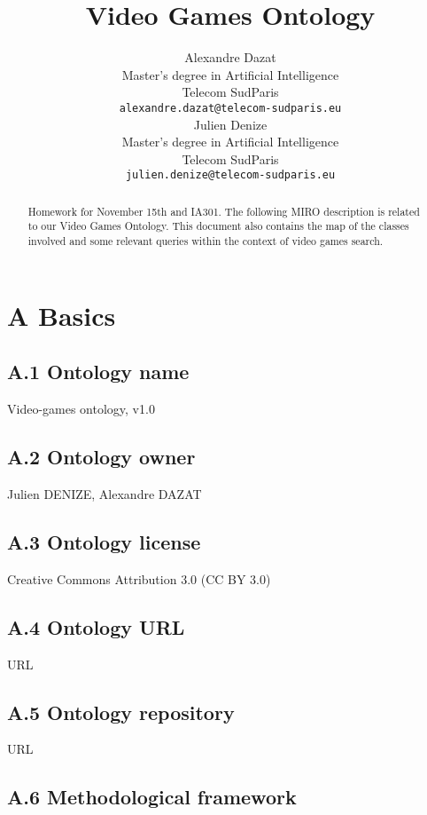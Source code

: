 \documentclass{article}
\title{Video Games Ontology}
\author{
  Alexandre Dazat \\
  Master's degree in Artificial Intelligence\\
  Telecom SudParis\\
  \texttt{alexandre.dazat@telecom-sudparis.eu} \\
   \And
  Julien Denize\\
  Master's degree in Artificial Intelligence\\
  Telecom SudParis\\
  \texttt{julien.denize@telecom-sudparis.eu} \\
}
\begin{document}
\maketitle

\begin{abstract}
Homework for November 15th and IA301. 
The following MIRO description is related to our Video Games Ontology. This document also contains the map of the classes involved and some relevant queries within the context of video games search. 
\end{abstract}



\section*{A Basics}

\subsection*{A.1 Ontology name}
Video-games ontology, v1.0 

\subsection*{A.2 Ontology owner}

Julien DENIZE, Alexandre DAZAT

\subsection*{A.3 Ontology license}

Creative Commons Attribution 3.0 (CC BY 3.0) 

\subsection*{A.4 Ontology URL}

URL 


\subsection*{A.5 Ontology repository }

URL
\subsection*{A.6 Methodological framework}
\end{document}
